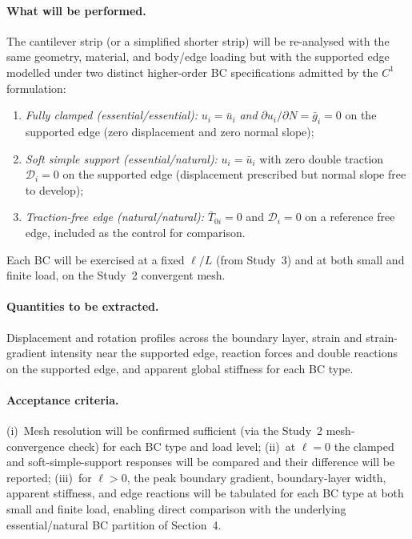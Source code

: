 \documentclass[11pt]{article}
\begin{document}
\paragraph{What will be performed.}
The cantilever strip (or a simplified shorter strip) will be
re-analysed with the same geometry, material, and body/edge
loading but with the supported edge modelled under two
distinct higher-order BC specifications admitted by the
$C^1$ formulation:
\begin{enumerate}
  \item[(i)]  \emph{Fully clamped (essential/essential):}
    $u_i=\bar{u}_i$ \emph{and}
    $\partial u_i/\partial N=\bar{g}_i=0$ on the supported edge
    (zero displacement and zero normal slope);
  \item[(ii)] \emph{Soft simple support (essential/natural):}
    $u_i=\bar{u}_i$ with zero double traction
    $\mathcal{D}_i=0$ on the supported edge (displacement
    prescribed but normal slope free to develop);
  \item[(iii)] \emph{Traction-free edge (natural/natural):}
    $\bar{T}_{0i}=0$ and $\mathcal{D}_i=0$ on a reference
    free edge, included as the control for comparison.
\end{enumerate}
Each BC will be exercised at a fixed $\ell/L$ (from Study~3)
and at both small and finite load, on the Study~2 convergent
mesh.

\paragraph{Quantities to be extracted.}
Displacement and rotation profiles across the boundary layer,
strain and strain-gradient intensity near the supported edge,
reaction forces and double reactions on the supported edge,
and apparent global stiffness for each BC type.

\paragraph{Acceptance criteria.}
(i)~Mesh resolution will be confirmed sufficient (via the
Study~2 mesh-convergence check) for each BC type and load
level; (ii)~at $\ell=0$ the clamped and soft-simple-support
responses will be compared and their difference will be
reported; (iii)~for $\ell>0$, the peak boundary gradient,
boundary-layer width, apparent stiffness, and edge reactions
will be tabulated for each BC type at both small and finite
load, enabling direct comparison with the underlying
essential/natural BC partition of Section~4.
\end{document}
